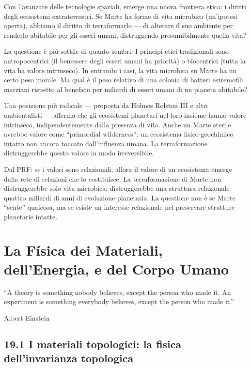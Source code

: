 \documentclass[11.5pt,a4paper,openany]{book}
\theoremstyle{remark}
\begin{document}
Con l'avanzare delle tecnologie spaziali, emerge una nuova frontiera etica: i diritti degli ecosistemi extraterrestri. Se Marte ha forme di vita microbica (un'ipotesi aperta), abbiamo il diritto di terraformarlo --- di alterare il suo ambiente per renderlo abitabile per gli esseri umani, distruggendo presumibilmente quella vita?

La questione è più sottile di quanto sembri. I principi etici tradizionali sono antropocentrici (il benessere degli esseri umani ha priorità) o biocentrici (tutta la vita ha valore intrinseco). In entrambi i casi, la vita microbica su Marte ha un certo peso morale. Ma qual è il peso relativo di una colonia di batteri estremofili marziani rispetto al beneficio per miliardi di esseri umani di un pianeta abitabile?

Una posizione più radicale --- proposta da Holmes Rolston III e altri ambientalisti --- afferma che gli ecosistemi planetari nel loro insieme hanno valore intrinseco, indipendentemente dalla presenza di vita. Anche un Marte sterile avrebbe valore come ``primordial wilderness'': un ecosistema fisico-geochimico intatto non ancora toccato dall'influenza umana. La terraformazione distruggerebbe questo valore in modo irreversibile.

Dal PRF: se i valori sono relazionali, allora il valore di un ecosistema emerge dalla rete di relazioni che lo costituisce. La terraformazione di Marte non distruggerebbe solo vita microbica: distruggerebbe una struttura relazionale quattro miliardi di anni di evoluzione planetaria. La questione non è se Marte ``sente'' qualcosa, ma se esiste un interesse relazionale nel preservare strutture planetarie intatte.

\chapter{La Física dei Materiali, dell'Energia, e del Corpo Umano}

\epigraph{``A theory is something nobody believes, except the person who made it. An experiment is something everybody believes, except the person who made it.''}{Albert Einstein}

\section{19.1 I materiali topologici: la fisica dell'invarianza topologica}
\end{document}
